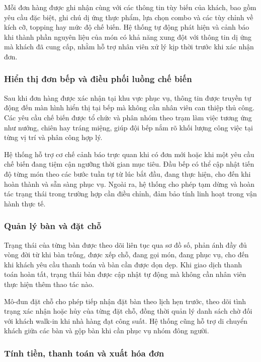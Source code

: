 Mỗi đơn hàng được ghi nhận cùng với các thông tin tùy biến của khách, bao gồm yêu cầu đặc biệt, ghi chú dị ứng thực phẩm, lựa chọn combo và các tùy chỉnh về kích cỡ, topping hay mức độ chế biến. Hệ thống tự động phát hiện và cảnh báo khi thành phần nguyên liệu của món có khả năng xung đột với thông tin dị ứng mà khách đã cung cấp, nhằm hỗ trợ nhân viên xử lý kịp thời trước khi xác nhận đơn.

\subsubsection{Hiển thị đơn bếp và điều phối luồng chế biến}

Sau khi đơn hàng được xác nhận tại khu vực phục vụ, thông tin được truyền tự động đến màn hình hiển thị tại bếp mà không cần nhân viên can thiệp thủ công. Các yêu cầu chế biến được tổ chức và phân nhóm theo trạm làm việc tương ứng như nướng, chiên hay tráng miệng, giúp đội bếp nắm rõ khối lượng công việc tại từng vị trí và phân công hợp lý.

Hệ thống hỗ trợ cơ chế cảnh báo trực quan khi có đơn mới hoặc khi một yêu cầu chế biến đang tiệm cận ngưỡng thời gian mục tiêu. Đầu bếp có thể cập nhật tiến độ từng món theo các bước tuần tự từ lúc bắt đầu, đang thực hiện, cho đến khi hoàn thành và sẵn sàng phục vụ. Ngoài ra, hệ thống cho phép tạm dừng và hoàn tác trạng thái trong trường hợp cần điều chỉnh, đảm bảo tính linh hoạt trong vận hành thực tế.

\subsubsection{Quản lý bàn và đặt chỗ}

Trạng thái của từng bàn được theo dõi liên tục qua sơ đồ số, phản ánh đầy đủ vòng đời từ khi bàn trống, được xếp chỗ, đang gọi món, đang phục vụ, cho đến khi khách yêu cầu thanh toán và bàn cần được dọn dẹp. Khi giao dịch thanh toán hoàn tất, trạng thái bàn được cập nhật tự động mà không cần nhân viên thực hiện thêm thao tác nào.

Mô-đun đặt chỗ cho phép tiếp nhận đặt bàn theo lịch hẹn trước, theo dõi tình trạng xác nhận hoặc hủy của từng đặt chỗ, đồng thời quản lý danh sách chờ đối với khách walk-in khi nhà hàng đạt công suất. Hệ thống cũng hỗ trợ di chuyển khách giữa các bàn và gộp bàn khi cần phục vụ nhóm đông người.

\subsubsection{Tính tiền, thanh toán và xuất hóa đơn}


